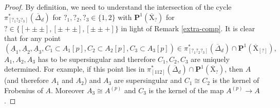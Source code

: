 \documentclass[10pt]{amsart}
\numberwithin{equation}{section}
\theoremstyle{plain}
\numberwithin{equation}{section}
\theoremstyle{definition}
\theoremstyle{remark}
\def\PP{\mathbf{P}}
\def\rmX{\mathrm{X}}
\def\rmXbar{\overline{\rmX}}
\begin{document}
\begin{proof}
By definition, we need to understand the intersection of the cycle $\pi^{\ast}_{[?_{1}?_{2}?_{3}]}(\overline{\Delta}_{d})$ for $?_{1}, ?_{2}, ?_{3}\in\{1, 2\}$ with $\PP^{1}(\rmXbar_{?})$ for $?\in\{[+\pm\pm], [\pm+\pm], [\pm\pm+]\}$ in light of Remark \ref{extra-comp}. It is clear that for any point 
\begin{equation*}
(\underline{A}_{1}, \underline{A}_{2}, \underline{A}_{3}, C_{1}\subset A_{1}[p], C_{2}\subset A_{2}[p], C_{3}\subset A_{3}[p])\in \pi^{\ast}_{[?_{1}?_{2}?_{3}]}(\overline{\Delta}_{d})\cap \PP^{1}(\rmXbar_{[?]}), 
\end{equation*}
$A_{1}, A_{2}, A_{3} $ has to be supersingular and therefore $C_{1}, C_{2}, C_{3}$ are uniquely determined. For example, if this point lies in $\pi^{\ast}_{[112]}(\overline{\Delta}_{d})\cap \PP^{1}(\rmXbar_{?})$, then $A$ (and therefore ${A}_{1}$ and ${A}_{2}$) and ${A}_{3}$ are supersingular and $C_{1}\cong C_{2}$ is the kernel of Frobenius of $A$. Moreover ${A}_{3}\cong A^{(p)}$ and $C_{3}$ is the kernel of the map $A^{(p)}\rightarrow A$.


\end{proof}
\end{document}
